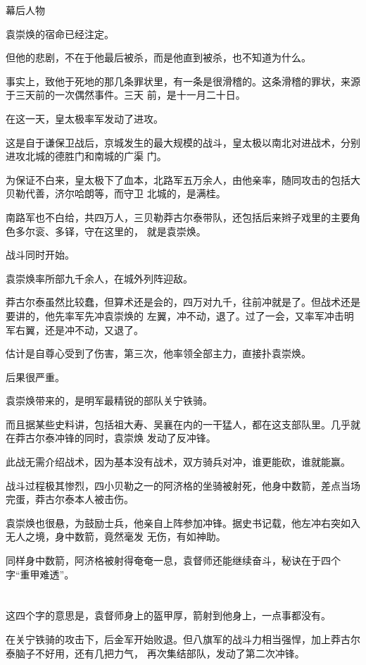 \documentclass[11pt,a4paper,onecolumn]{article}
\begin{document}
幕后人物

袁崇焕的宿命已经注定。

但他的悲剧，不在于他最后被杀，而是他直到被杀，也不知道为什么。

事实上，致他于死地的那几条罪状里，有一条是很滑稽的。这条滑稽的罪状，来源于三天前的一次偶然事件。三天
前，是十一月二十日。

在这一天，皇太极率军发动了进攻。

这是自于谦保卫战后，京城发生的最大规模的战斗，皇太极以南北对进战术，分别进攻北城的德胜门和南城的广渠
门。

为保证不白来，皇太极下了血本，北路军五万余人，由他亲率，随同攻击的包括大贝勒代善，济尔哈朗等，而守卫
北城的，是满桂。

南路军也不白给，共四万人，三贝勒莽古尔泰带队，还包括后来辫子戏里的主要角色多尔衮、多铎，守在这里的，
就是袁崇焕。

战斗同时开始。

袁崇焕率所部九千余人，在城外列阵迎敌。

莽古尔泰虽然比较蠢，但算术还是会的，四万对九千，往前冲就是了。但战术还是要讲的，他先率军先冲袁崇焕的
左翼，冲不动，退了。过了一会，又率军冲击明军右翼，还是冲不动，又退了。

估计是自尊心受到了伤害，第三次，他率领全部主力，直接扑袁崇焕。

后果很严重。

袁崇焕带来的，是明军最精锐的部队\myrule 关宁铁骑。

而且据某些史料讲，包括祖大寿、吴襄在内的一干猛人，都在这支部队里。几乎就在莽古尔泰冲锋的同时，袁崇焕
发动了反冲锋。

此战无需介绍战术，因为基本没有战术，双方骑兵对冲，谁更能砍，谁就能赢。

战斗过程极其惨烈，四小贝勒之一的阿济格的坐骑被射死，他身中数箭，差点当场完蛋，莽古尔泰本人被击伤。

袁崇焕也很悬，为鼓励士兵，他亲自上阵参加冲锋。据史书记载，他左冲右突如入无人之境，身中数箭，竟然毫发
无伤，有如神助。

同样身中数箭，阿济格被射得奄奄一息，袁督师还能继续奋斗，秘诀在于四个字\myrule ``重甲难透''。

\section[\thesection]{}

这四个字的意思是，袁督师身上的盔甲厚，箭射到他身上，一点事都没有。

在关宁铁骑的攻击下，后金军开始败退。但八旗军的战斗力相当强悍，加上莽古尔泰脑子不好用，还有几把力气，
再次集结部队，发动了第二次冲锋。
\end{document}
